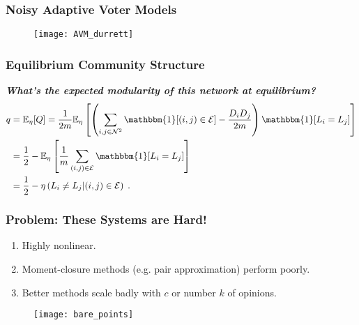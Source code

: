 \documentclass{beamer}
\newcommand\E[0]{\mathbb{E}}
\begin{document}
		
		\begin{frame}\frametitle{Noisy Adaptive Voter Models}
			\begin{figure}
				\centering
					\texttt{[image: AVM\_durrett]}	
				\caption{\tiny{}} 
			\end{figure}
		\end{frame}
	
		
		\begin{frame}\frametitle{Equilibrium Community Structure}
			\emph{\textbf{What's the expected modularity of this network at equilibrium?}}
			\begin{align*}
				q &= \E_\eta[Q] = \frac{1}{2m}\E_\eta\left[\left(\sum_{i,j \in \mathcal{N}^2} \mathbbm{1}[(i,j) \in \mathcal{E} ] - \frac{D_i D_j}{2m}\right)\mathbbm{1}[L_i = L_j]\right] \\ 
				&= \frac{1}{2} - \E_\eta\left[\frac{1}{m} \sum_{(i,j) \in \mathcal{E}} \mathbbm{1}[L_i = L_j]\right] \\ 
				&= \frac{1}{2} - \eta\left(L_i \neq L_j|(i,j) \in \mathcal{E}\right)\;.
			\end{align*}
		\end{frame}
	
		
		\begin{frame}\frametitle{Problem: These Systems are Hard!}
			\begin{enumerate}
				\item Highly nonlinear.
				\item Moment-closure methods (e.g. pair approximation) perform poorly. 
				\item Better methods scale badly with $c$ or number $k$ of opinions.
			\end{enumerate}
		  	\begin{figure}
		  		\centering
		  		\texttt{[image: bare\_points]}
		  	\end{figure}
		\end{frame}
	
\end{document}
